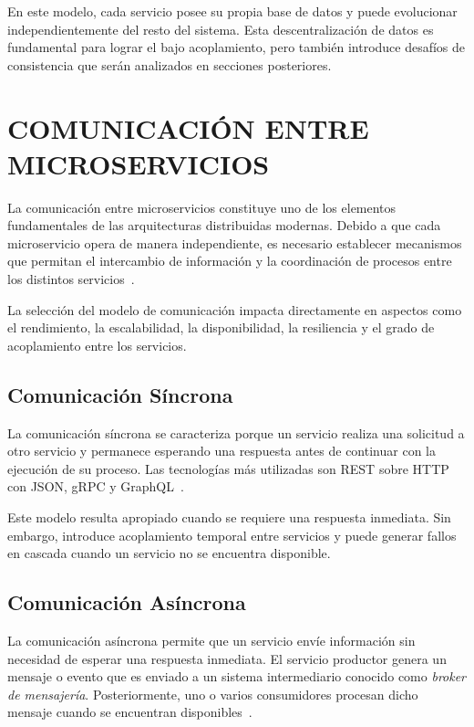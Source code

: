 

En este modelo, cada servicio posee su propia base de datos y puede evolucionar independientemente del resto del sistema. Esta descentralización de datos es fundamental para lograr el bajo acoplamiento, pero también introduce desafíos de consistencia que serán analizados en secciones posteriores.

\section{COMUNICACIÓN ENTRE MICROSERVICIOS}

La comunicación entre microservicios constituye uno de los elementos fundamentales de las arquitecturas distribuidas modernas. Debido a que cada microservicio opera de manera independiente, es necesario establecer mecanismos que permitan el intercambio de información y la coordinación de procesos entre los distintos servicios~\parencite{richardson2018}.

La selección del modelo de comunicación impacta directamente en aspectos como el rendimiento, la escalabilidad, la disponibilidad, la resiliencia y el grado de acoplamiento entre los servicios.

\subsection{Comunicación Síncrona}

La comunicación síncrona se caracteriza porque un servicio realiza una solicitud a otro servicio y permanece esperando una respuesta antes de continuar con la ejecución de su proceso. Las tecnologías más utilizadas son REST sobre HTTP con JSON, gRPC y GraphQL~\parencite{richardson2018}.

Este modelo resulta apropiado cuando se requiere una respuesta inmediata. Sin embargo, introduce acoplamiento temporal entre servicios y puede generar fallos en cascada cuando un servicio no se encuentra disponible.

\subsection{Comunicación Asíncrona}

La comunicación asíncrona permite que un servicio envíe información sin necesidad de esperar una respuesta inmediata. El servicio productor genera un mensaje o evento que es enviado a un sistema intermediario conocido como \textit{broker de mensajería}. Posteriormente, uno o varios consumidores procesan dicho mensaje cuando se encuentran disponibles~\parencite{kleppmann2017}.

